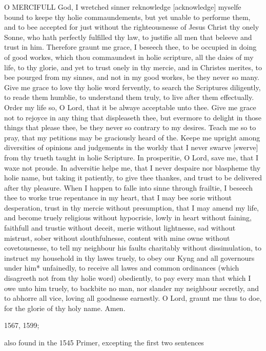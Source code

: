 O
MERCIFULL God, I wretched sinner reknowledge
[acknowledge] myselfe bound to keepe thy holie commaundements,
but yet unable to performe them, and to bee accepted for just without
the righteousnesse of Jesus Christ thy onely Sonne, who hath perfectly
fulfilled thy law, to justifie all men that beleeve and trust in him.
Therefore graunt me grace, I beseech thee, to be occupied in doing of
good workes, which thou commaundest in holie scripture, all the daies
of my life, to thy glorie, and yet to trust onely in thy mercie, and in
Christes merites, to bee pourged from my sinnes, and not in my good workes,
be they never so many. Give me grace to love thy holie word fervently,
to search the Scriptures diligently, to reade them humblie, to understand
them truly, to live after them effectually. Order my life so, O Lord,
that it be alwaye acceptable unto thee. Give me grace not to rejoyce in
any thing that displeaseth thee, but evermore to delight in those things
that please thee, be they never so contrary to my desires. Teach me so
to pray, that my petitions may be graciously heard of the. Keepe me upright
among diversities of opinions and judgements in the worldy that I never
swarve [swerve]
from thy trueth taught in holie Scripture. In prosperitie, O Lord, save
me, that I waxe not proude. In adversitie helpe me, that I never despaire
nor blaspheme thy holie name, but taking it patiently, to give thee thankes,
and trust to be delivered after thy pleasure. When I happen to falle into
sinne through frailtie, I beseech thee to worke true repentance in my
heart, that I may bee sorie without desperation, trust in thy mercie without
presumption, that I may amend my life, and become truely religious without
hypocrisie, lowly in heart without faining, faithfull and trustie without
deceit, merie without lightnesse, sad without mistrust, sober without
slouthfulnesse, content with mine owne without covetousnesse, to tell
my neighbour his faults charitably without dissimulation, to instruct
my household in thy lawes truely, to obey our Kyng and all governours
under him* unfainedly, to receive all lawes and common ordinances (which
disagreeth not from thy holie word) obediently, to pay every man that
which I owe unto him truely, to backbite no man, nor slander my neighbour
secretly, and to abhorre all vice, loving all goodnesse earnestly. O Lord,
graunt me thus to doe, for the glorie of thy holy name. Amen.

1567,
1599;

also found in the 1545 Primer, excepting the first two sentences

